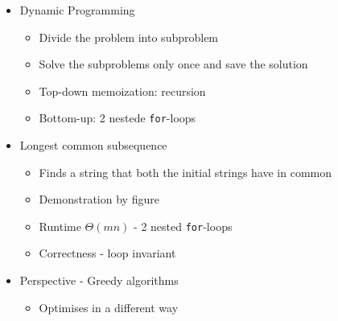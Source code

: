 \begin{itemize}
    \item Dynamic Programming
    \begin{itemize}
        \item Divide the problem into subproblem
        \item Solve the subproblems only once and save the solution
        \item Top-down memoization: recursion
        \item Bottom-up: 2 nestede \texttt{for}-loops
    \end{itemize}
    \item Longest common subsequence
    \begin{itemize}
        \item Finds a string that both the initial strings have in common
        \item Demonstration by figure
        \item Runtime $\Theta(mn)$ - 2 nested \texttt{for}-loops
        \item Correctness - loop invariant
    \end{itemize}
    \item Perspective - Greedy algorithms
    \begin{itemize}
        \item Optimises in a different way
    \end{itemize}
\end{itemize}
